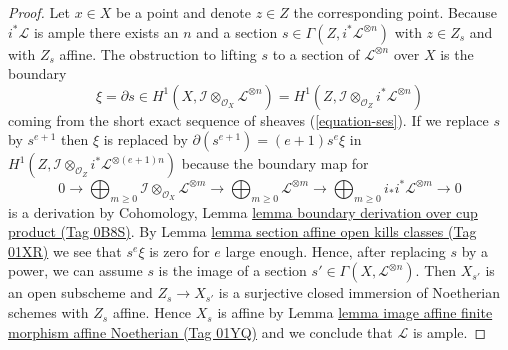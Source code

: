 \documentclass{amsart}
\theoremstyle{plain}
\theoremstyle{definition}
\theoremstyle{remark}
\numberwithin{equation}{subsection}
\begin{document}
\begin{proof}
\medskip\noindent
Let $x \in X$ be a point and denote $z \in Z$ the corresponding point.
Because $i^*\mathcal{L}$ is ample there exists an $n$ and a section
$s \in \Gamma(Z, i^*\mathcal{L}^{\otimes n})$ with $z \in Z_s$
and with $Z_s$ affine. The obstruction to lifting $s$ to a section
of $\mathcal{L}^{\otimes n}$ over $X$ is the boundary
$$
\xi = \partial s \in
H^1(X, \mathcal{I} \otimes_{\mathcal{O}_X} \mathcal{L}^{\otimes n}) =
H^1(Z, \mathcal{I} \otimes_{\mathcal{O}_Z} i^*\mathcal{L}^{\otimes n})
$$
coming from the short exact sequence of sheaves (\ref{equation-ses}).
If we replace $s$ by $s^{e + 1}$ then $\xi$ is replaced by
$\partial(s^{e + 1}) = (e + 1) s^e \xi$ in
$H^1(Z, \mathcal{I} \otimes_{\mathcal{O}_Z} i^*\mathcal{L}^{\otimes (e + 1)n})$
because the boundary map for
$$
0 \to
\bigoplus\nolimits_{m \geq 0}
\mathcal{I} \otimes_{\mathcal{O}_X} \mathcal{L}^{\otimes m} \to
\bigoplus\nolimits_{m \geq 0}
\mathcal{L}^{\otimes m} \to
\bigoplus\nolimits_{m \geq 0}
i_*i^*\mathcal{L}^{\otimes m} \to 0
$$
is a derivation by Cohomology, Lemma
\href{https://stacks.math.columbia.edu/tag/0B8S}{lemma boundary derivation over cup product (Tag 0B8S)}. By
Lemma \href{https://stacks.math.columbia.edu/tag/01XR}{lemma section affine open kills classes (Tag 01XR)}
we see that $s^e \xi$ is zero for $e$ large enough.
Hence, after replacing $s$ by a power, we can assume $s$ is the image
of a section $s' \in \Gamma(X, \mathcal{L}^{\otimes n})$.
Then $X_{s'}$ is an open subscheme and $Z_s \to X_{s'}$ is a surjective
closed immersion of Noetherian schemes with $Z_s$ affine. Hence
$X_s$ is affine by
Lemma \href{https://stacks.math.columbia.edu/tag/01YQ}{lemma image affine finite morphism affine Noetherian (Tag 01YQ)} and
we conclude that $\mathcal{L}$ is ample.
\end{proof}
\end{document}

